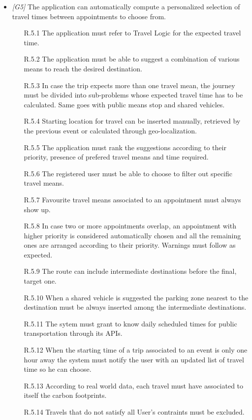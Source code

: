 \begin{itemize}
	\item \textit{[G5]} The application can automatically compute a personalized selection of travel times between appointments to choose from.
		\begin{itemize}
			\item [R.5.1] The application must refer to Travel Logic for the expected travel time.
			\item [R.5.2] The application must be able to suggest a combination of various means to reach the desired destination.
			\item [R.5.3] In case the trip expects more than one travel mean, the journey must be divided into sub-problems whose expected travel time has to be calculated. Same goes with public means stop and shared vehicles.
			\item [R.5.4] Starting location for travel can be inserted manually, retrieved by the previous event or calculated through geo-localization.
			\item [R.5.5] The application must rank the suggestions according to their priority, presence of prefered travel means and time required.
			\item [R.5.6] The registered user must be able to choose to filter out specific travel means.
			\item [R.5.7] Favourite travel means associated to an appointment must always show up.
			\item [R.5.8] In case two or more appointments overlap, an appointment with higher priority is considered automatically chosen and all the remaining ones are arranged according to their priority. Warnings must follow as expected.
			\item [R.5.9] The route can include intermediate destinations before the final, target one.
			\item [R.5.10] When a shared vehicle is suggested the parking zone nearest to the destination must be always inserted among the intermediate destinations.
			\item [R.5.11] The sytem must grant to know daily scheduled times for public transportation through its APIs.
			\item [R.5.12] When the starting time of a trip associated to an event is only one hour away the system must notify the user with an updated list of travel time so he can choose.
			\item [R.5.13] According to real world data, each travel must have associated to itself the carbon footprints.
			\item [R.5.14] Travels that do not satisfy all User's contraints must be excluded.
		\end{itemize}
                  

\end{itemize}
